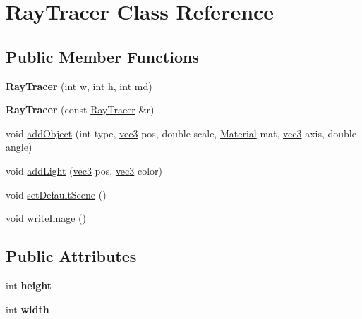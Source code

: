 \hypertarget{class_ray_tracer}{
\section{RayTracer Class Reference}
\label{class_ray_tracer}
}
\subsection*{Public Member Functions}
\begin{DoxyCompactItemize}
\item 
\hypertarget{class_ray_tracer_abdb2a1446a998ce13c7458d3220a3e98}{
{\bfseries RayTracer} (int w, int h, int md)}
\label{class_ray_tracer_abdb2a1446a998ce13c7458d3220a3e98}

\item 
\hypertarget{class_ray_tracer_a41378f964e6aec24f6923c9032d36b24}{
{\bfseries RayTracer} (const \hyperlink{class_ray_tracer}{RayTracer} \&r)}
\label{class_ray_tracer_a41378f964e6aec24f6923c9032d36b24}

\item 
void \hyperlink{class_ray_tracer_a668b4df1e86fca21aeffa7d76627274c}{addObject} (int type, \hyperlink{classvec3}{vec3} pos, double scale, \hyperlink{struct_material}{Material} mat, \hyperlink{classvec3}{vec3} axis, double angle)
\item 
void \hyperlink{class_ray_tracer_af009cebc70c4004b435fb5b0681f3a0f}{addLight} (\hyperlink{classvec3}{vec3} pos, \hyperlink{classvec3}{vec3} color)
\item 
void \hyperlink{class_ray_tracer_a6f58f6b9e85d891a94922b2ee4d27517}{setDefaultScene} ()
\item 
void \hyperlink{class_ray_tracer_acd65d366cf556539fcbd2a16a2cb6195}{writeImage} ()
\end{DoxyCompactItemize}
\subsection*{Public Attributes}
\begin{DoxyCompactItemize}
\item 
\hypertarget{class_ray_tracer_add488290127f3d2c26d25111826d2b1a}{
int {\bfseries height}}
\label{class_ray_tracer_add488290127f3d2c26d25111826d2b1a}

\item 
\hypertarget{class_ray_tracer_adf27eeb67a55ba584d4f4ff2bada46bc}{
int {\bfseries width}}
\label{class_ray_tracer_adf27eeb67a55ba584d4f4ff2bada46bc}

\end{DoxyCompactItemize}
